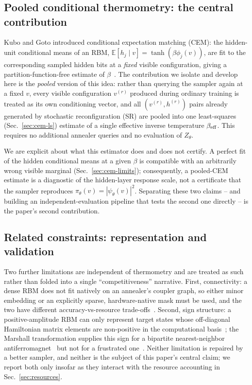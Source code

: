 \subsection{Pooled conditional thermometry: the central contribution}

Kubo and Goto introduced conditional expectation matching (CEM): the hidden-unit conditional means of an RBM, $\mathbb E[h_j\mid v]=\tanh(\beta\phi_j(v))$, are fit to the corresponding sampled hidden bits at a \emph{fixed} visible configuration, giving a partition-function-free estimate of $\beta$~\cite{Kubo2025,Kubo2026}. The contribution we isolate and develop here is the \emph{pooled} version of this idea: rather than querying the sampler again at a fixed $v$, every visible configuration $v^{(r)}$ produced during ordinary training is treated as its own conditioning vector, and all $(v^{(r)},h^{(r)})$ pairs already generated by stochastic reconfiguration (SR) are pooled into one least-squares (Sec.~\ref{sec:cem-ls}) estimate of a single effective inverse temperature $\beta_{\mathrm{eff}}$. This requires no additional annealer queries and no evaluation of $Z_\theta$.

We are explicit about what this estimator does and does not certify. A perfect fit of the hidden conditional means at a given $\beta$ is compatible with an arbitrarily wrong visible marginal (Sec.~\ref{sec:cem-limits}); consequently, a pooled-CEM estimate is a diagnostic of the hidden-layer response scale, not a certificate that the sampler reproduces $\pi_\theta(v)=|\psi_\theta(v)|^2$. Separating these two claims -- and building an independent-evaluation pipeline that tests the second one directly -- is the paper's second contribution.

\subsection{Related constraints: representation and validation}

Two further limitations are independent of thermometry and are treated as such rather than folded into a single ``competitiveness'' narrative. First, connectivity: a dense RBM does not fit natively on an annealer's coupler graph, so either minor embedding or an explicitly sparse, hardware-native mask must be used, and the two have different accuracy-vs-resource trade-offs~\cite{LeRoux2008}. Second, sign structure: a positive-amplitude RBM can only represent target states whose off-diagonal Hamiltonian matrix elements are non-positive in the computational basis~\cite{Bravyi2008}; the Marshall transformation supplies this sign for a bipartite nearest-neighbor antiferromagnet~\cite{Marshall1955} but not for a frustrated one~\cite{Richter1994,Voigt2000}. Neither limitation is repaired by a better sampler, and neither is the subject of this paper's central claim; we report both only insofar as they interact with the resource accounting in Sec.~\ref{sec:resources}.

